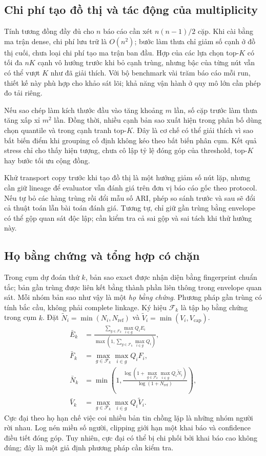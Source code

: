 \subsection{Chi phí tạo đồ thị và tác động của multiplicity}
Tính tương đồng đầy đủ cho $n$ báo cáo cần xét $n(n-1)/2$ cặp. Khi cài bằng ma trận dense, chi phí lưu trữ là $O(n^2)$; bước làm thưa chỉ giảm số cạnh ở đồ thị cuối, chưa loại chi phí tạo ma trận ban đầu. Hợp của các lựa chọn top-$K$ có tối đa $nK$ cạnh vô hướng trước khi bỏ cạnh trùng, nhưng bậc của từng nút vẫn có thể vượt $K$ như đã giải thích. Với bộ benchmark vài trăm báo cáo mỗi run, thiết kế này phù hợp cho khảo sát lõi; khả năng vận hành ở quy mô lớn cần phép đo tải riêng.

Nếu sao chép làm kích thước đầu vào tăng khoảng $m$ lần, số cặp trước làm thưa tăng xấp xỉ $m^2$ lần. Đồng thời, nhiều cạnh bản sao xuất hiện trong phân bố dùng chọn quantile và trong cạnh tranh top-$K$. Đây là cơ chế có thể giải thích vì sao bất biến điểm khi grouping cố định không kéo theo bất biến phân cụm. Kết quả stress chỉ cho thấy hiện tượng, chưa cô lập tỷ lệ đóng góp của threshold, top-$K$ hay bước tối ưu cộng đồng.

Khử transport copy trước khi tạo đồ thị là một hướng giảm số nút lặp, nhưng cần giữ lineage để evaluator vẫn đánh giá trên đơn vị báo cáo gốc theo protocol. Nếu tự bỏ các hàng trùng rồi đổi mẫu số ARI, phép so sánh trước và sau sẽ đổi cả thuật toán lẫn bài toán đánh giá. Tương tự, chỉ giữ gần trùng bằng envelope có thể gộp quan sát độc lập; cần kiểm tra cả sai gộp và sai tách khi thử hướng này.

\subsection{Họ bằng chứng và tổng hợp có chặn}\label{sec:02-evidence-family}
Trong cụm dự đoán thứ $k$, bản sao exact được nhận diện bằng fingerprint chuẩn tắc; bản gần trùng được liên kết bằng thành phần liên thông trong envelope quan sát. Mỗi nhóm bản sao như vậy là một \emph{họ bằng chứng}. Phương pháp gần trùng có tính bắc cầu, không phải complete linkage. Ký hiệu $\mathcal F_k$ là tập họ bằng chứng trong cụm $k$. Đặt $\widetilde N_i=\min(N_i,N_{\mathrm{ref}})$ và $\widetilde V_i=\min(V_i,V_{\mathrm{cap}})$.
\begin{align}
 \bar E_k&=\frac{\sum_{g\in\mathcal F_k}\max_{i\in g}Q_iE_i}
                    {\max(1,\sum_{g\in\mathcal F_k}\max_{i\in g}Q_i)},\label{eq:aggregate-e}\\
 \bar F_k&=\max_{g\in\mathcal F_k}\max_{i\in g}Q_iF_i,\label{eq:aggregate-f}\\
 \bar N_k&=\min\!\left(1,\frac{\log(1+\max_{g\in\mathcal F_k}\max_{i\in g}Q_i\widetilde N_i)}{\log(1+N_{\mathrm{ref}})}\right),\label{eq:aggregate-n}\\
 \bar V_k&=\max_{g\in\mathcal F_k}\max_{i\in g}Q_i\widetilde V_i.\label{eq:aggregate-v}
\end{align}
Cực đại theo họ hạn chế việc coi nhiều bản tin chồng lặp là những nhóm người rời nhau. Log nén miền số người, clipping giới hạn một khai báo và confidence điều tiết đóng góp. Tuy nhiên, cực đại có thể bị chi phối bởi khai báo cao không đúng; đây là một giả định phương pháp cần kiểm tra.

